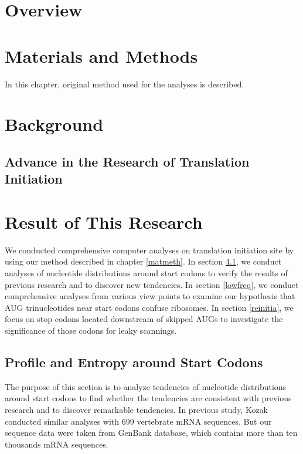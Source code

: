 \tableofcontents


\chapter{Overview}
\label{overv}


\chapter{Materials and Methods}

In this chapter, original method used for the analyses is described.

\label{matmeth}



\chapter{Background}
\label{backgr}


% 

\section{Advance in the Research of Translation Initiation}
\label{surv}





\chapter{Result of This Research}

We conducted comprehensive computer analyses on translation initiation 
site by using our method described in chapter \ref{matmeth}.
In section \ref{prof_ent}, we conduct analyses of nucleotide
distributions around start codons to verify the results of previous
research and to discover new tendencies.
In section \ref{lowfreq}, we conduct comprehensive analyses from
various view points to examine our hypothesis that  AUG trinucleotides
near start codons confuse ribosomes. In section \ref{reinitia}, we
focus on stop codons located downstream of skipped AUGs to investigate the
significance of those codons for leaky scannings.

\label{resu}
\section{Profile and Entropy around Start Codons}
\label{prof_ent}

The purpose of this section is to analyze tendencies of nucleotide
distributions around start codons to find whether the tendencies are
consistent with previous research and to discover remarkable tendencies.
In previous study, Kozak conducted similar analyses with
699 vertebrate mRNA sequences\cite{label3}.
But our sequence data were taken from
GenBank database, which contains more than ten thousands mRNA sequences.



